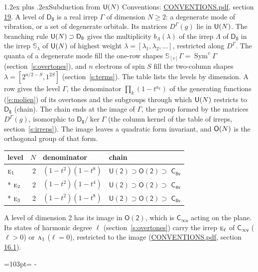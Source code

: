 \documentclass[10pt,a4paper]{article}
\makeatletter
\renewcommand\section{\@startsection{section}{1}{\z@}{-3ex plus -1ex minus -.2ex}%
  {1.2ex plus .2ex}{\normalfont\large\sffamily\bfseries\color{parttitle}}}
\newcommand{\needspace}[1]{\par\penalty-100\begingroup\dimen0=#1\relax\dimen2=\pagegoal
  \advance\dimen2-\pagetotal\ifdim\dimen0>\dimen2\relax\ifdim\dimen2>0pt\vfil\break\fi\fi
  \endgroup}
\numberwithin{equation}{section}
\newcommand{\grp}[1]{\mathsf{#1}}
\newcommand{\irr}[1]{\text{\normalfont\scshape #1}}
\newcommand{\repD}[1]{D^{#1}}
\newcommand{\schur}[1]{\mathbb{S}_{#1}}
\newcommand{\shape}[1]{[#1]}
\makeatother
\begin{document}
\section{Subduction from \texorpdfstring{$\grp{U(\mathnormal{N})}$}{U(N)}}\label{s:unitary}
Conventions: \href{../../CONVENTIONS.pdf}{CONVENTIONS.pdf}, section \href{../../CONVENTIONS.pdf\#conv.19}{19}.
\leavevmode\label{n:local.level.dimension}A level of $\grp{D_{8}}$ is a real irrep $\Gamma$ of dimension $N \ge 2$: a degenerate mode of vibration, or a set of degenerate orbitals. \label{n:group.unitary}Its matrices $\repD{\Gamma}(g)$ lie in $\grp{U(\mathnormal{N})}$. \label{n:irrep.schur}\label{n:shape.partition}\label{n:local.partition}\label{n:function.multiplicity.unitary}The branching rule $\grp{U(\mathnormal{N})} \supset \grp{D_{8}}$ gives the multiplicity $b_\Lambda(\lambda)$ of the irrep $\Lambda$ of $\grp{D_{8}}$ in the irrep $\schur{\lambda}$ of $\grp{U(\mathnormal{N})}$ of highest weight $\lambda = \shape{\lambda_1, \lambda_2, \dots}$, restricted along $\repD{\Gamma}$. \label{n:local.partition.power}\label{n:local.electrons}\label{n:local.spin}The quanta of a degenerate mode fill the one-row shapes $\schur{\shape{v}}\Gamma = \operatorname{Sym}^{v}\Gamma$ (section~\ref{s:overtones}), and $n$ electrons of spin $S$ fill the two-column shapes $\lambda = \shape{2^{n/2-S}, 1^{2S}}$ (section~\ref{s:terms}).
The table lists the levels by dimension. \label{n:head.level}\label{n:head.denominator}\label{n:index.overtone.denominator}\label{n:head.chain}A row gives the level $\Gamma$, the denominator $\prod_k (1 - t^{a_k})$ of the generating functions (\ref{e:molien}) of its overtones and the subgroups through which $\grp{U(\mathnormal{N})}$ restricts to $\grp{D_{8}}$ (chain). The chain ends at the image of $\Gamma$, the group formed by the matrices $\repD{\Gamma}(g)$, isomorphic to $\grp{D_{8}}/\ker\Gamma$ (the column kernel of the table of irreps, section~\ref{s:irreps}). The image leaves a quadratic form invariant, and $\grp{O(\mathnormal{N})}$ is the orthogonal group of that form.
{\small\begin{longtable}{@{}lrll@{}}\toprule
level & $N$ & denominator & chain\\\midrule\endhead
\bottomrule\endfoot\endlastfoot
$\irr{e}_{1}$ & 2 & $(1-t^{2})(1-t^{8})$ & $\grp{U(2)} \supset \grp{O(2)} \supset$ \href{C8v.pdf}{$\grp{C_{8v}}$}\\*
$\irr{e}_{2}$ & 2 & $(1-t^{2})(1-t^{4})$ & $\grp{U(2)} \supset \grp{O(2)} \supset$ \href{C4v.pdf}{$\grp{C_{4v}}$}\\*
$\irr{e}_{3}$ & 2 & $(1-t^{2})(1-t^{8})$ & $\grp{U(2)} \supset \grp{O(2)} \supset$ \href{C8v.pdf}{$\grp{C_{8v}}$}\\
\bottomrule\end{longtable}}
A level of dimension 2 has its image in $\grp{O(2)}$, which is \href{Cinfv.pdf}{$\grp{C_{\infty v}}$} acting on the plane. \label{n:index.harmonic.degree}Its states of harmonic degree $\ell$ (section~\ref{s:overtones}) carry the irrep $\irr{e}_{\ell}$ of \href{Cinfv.pdf}{$\grp{C_{\infty v}}$} ($\ell > 0$) or $\irr{a}_{1}$ ($\ell = 0$), restricted to the image (\href{../../CONVENTIONS.pdf}{CONVENTIONS.pdf}, section \href{../../CONVENTIONS.pdf\#conv.16.1}{16.1}).
\needspace{103pt}
\end{document}

